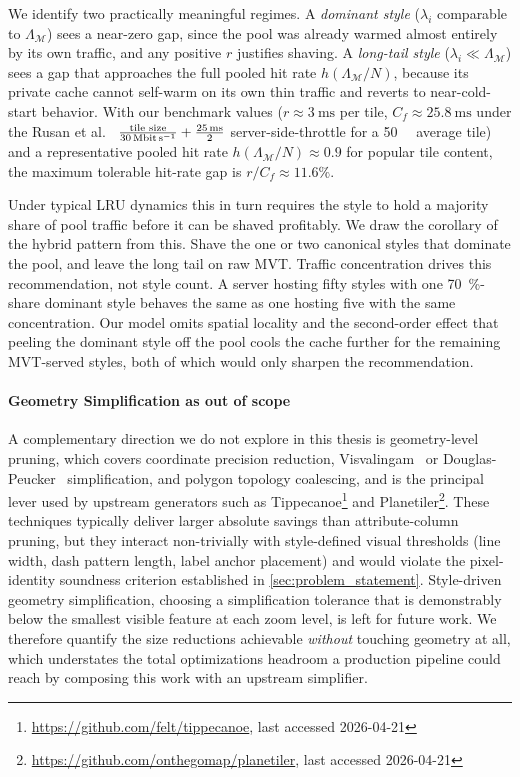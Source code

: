 We identify two practically meaningful regimes.
A \emph{dominant style} ($\lambda_i$ comparable to $\Lambda_\mathcal{M}$) sees a near-zero gap, since the pool was already warmed almost entirely by its own traffic, and any positive $r$ justifies shaving.
A \emph{long-tail style} ($\lambda_i \ll \Lambda_\mathcal{M}$) sees a gap that approaches the full pooled hit rate $h(\Lambda_\mathcal{M}/N)$, because its private cache cannot self-warm on its own thin traffic and reverts to near-cold-start behavior.
With our benchmark values ($r \approx \qty{3}{\milli\second}$ per tile, $C_f \approx \qty{25.8}{\milli\second}$ under the Rusan et al.~\cite{rusanAssessmentPacketLatency2015} $\frac{\text{tile size}}{\qty{30}{\mega\bit\per\second}} + \frac{\qty{25}{\milli\second}}{2}$ server-side-throttle for a \qty{50}{\kilo\byte} average tile) and a representative pooled hit rate $h(\Lambda_\mathcal{M}/N) \approx 0.9$ for popular tile content, the maximum tolerable hit-rate gap is $r/C_f \approx 11.6\%$.

Under typical \ac{LRU} dynamics this in turn requires the style to hold a majority share of pool traffic before it can be shaved profitably.
We draw the corollary of the hybrid pattern from this.
Shave the one or two canonical styles that dominate the pool, and leave the long tail on raw \ac{MVT}.
Traffic concentration drives this recommendation, not style count.
A server hosting fifty styles with one \qty{70}{\percent}-share dominant style behaves the same as one hosting five with the same concentration.
Our model omits spatial locality and the second-order effect that peeling the dominant style off the pool cools the cache further for the remaining \ac{MVT}-served styles, both of which would only sharpen the recommendation.

\paragraph{Geometry Simplification as out of scope}
A complementary direction we do not explore in this thesis is geometry-level pruning, which covers coordinate precision reduction, Visvalingam~\cite{visvalingamLineGeneralisationRepeated1993} or Douglas-Peucker~\cite{douglasALGORITHMSREDUCTIONNUMBER1973} simplification, and polygon topology coalescing, and is the principal lever used by upstream generators such as Tippecanoe\footnote{\url{https://github.com/felt/tippecanoe}, last accessed 2026-04-21} and Planetiler\footnote{\url{https://github.com/onthegomap/planetiler}, last accessed 2026-04-21}.
These techniques typically deliver larger absolute savings than attribute-column pruning, but they interact non-trivially with style-defined visual thresholds (line width, dash pattern length, label anchor placement) and would violate the pixel-identity soundness criterion established in \cref{sec:problem_statement}.
Style-driven geometry simplification, choosing a simplification tolerance that is demonstrably below the smallest visible feature at each zoom level, is left for future work.
We therefore quantify the size reductions achievable \emph{without} touching geometry at all, which understates the total optimizations headroom a production pipeline could reach by composing this work with an upstream simplifier.

